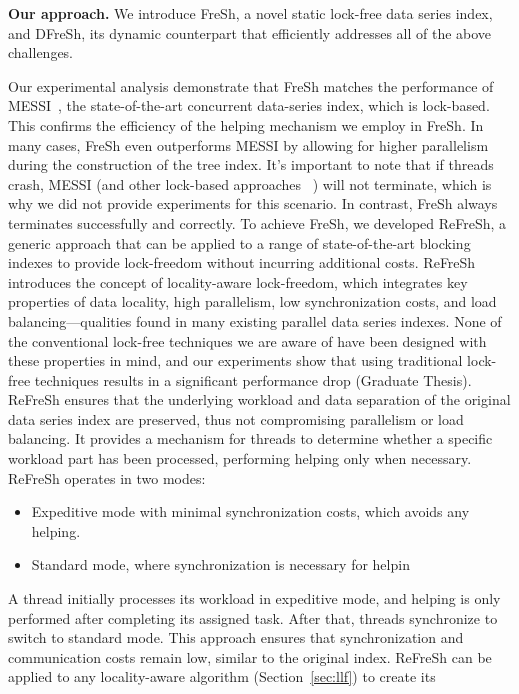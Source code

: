 \documentclass[a4paper,11pt,twoside,openany]{book}
\begin{document}
\noindent
{\bf Our approach.}
We introduce FreSh, a novel static lock-free data series index, and DFreSh, 
its dynamic counterpart that efficiently addresses all of the above challenges. 

Our experimental analysis demonstrate that FreSh matches the performance of 
MESSI~\cite{PFP21-I}, the state-of-the-art concurrent data-series index, which is lock-based. 
This confirms the efficiency of the helping mechanism we employ in FreSh. In many cases, 
FreSh even outperforms MESSI by allowing for higher parallelism during the construction of the
tree index.
It's important to note that if threads crash, MESSI (and other lock-based approaches
~\cite{peng2018paris,PFP21-I,PFP21-II,hercules}) will not terminate, which is 
why we did not provide experiments for this scenario. In contrast, 
FreSh always terminates successfully and correctly.
%
To achieve FreSh, we developed ReFreSh, a generic approach that can be applied to a
range of state-of-the-art blocking indexes to provide lock-freedom without 
incurring additional costs. 
%
ReFreSh introduces the concept of locality-aware lock-freedom, which integrates
key properties of data locality, high parallelism, low synchronization costs,
and load balancing—qualities found in many existing parallel data series indexes.
None of the conventional lock-free techniques we are aware of have been designed with
these properties in mind, and our experiments show that using traditional lock-free
techniques results in a significant performance drop (Graduate Thesis).
%
ReFreSh ensures that the underlying workload and data separation of the original data series
index are preserved, thus not compromising parallelism or load balancing. It provides a mechanism
for threads to determine whether a specific workload part has been processed, performing helping
only when necessary. ReFreSh operates in two modes:
\begin{itemize}
    \item Expeditive mode with minimal synchronization costs, which avoids any helping.
    \item Standard mode, where synchronization is necessary for helpin
\end{itemize}
%
A thread initially processes its workload in expeditive mode, and helping is only performed
after completing its assigned task. After that, threads synchronize to switch to standard mode.
This approach ensures that synchronization and communication costs remain low, similar to the
original index.
%
ReFreSh can be applied to any locality-aware algorithm (Section~\ref{sec:llf}) to create its
\end{document}
